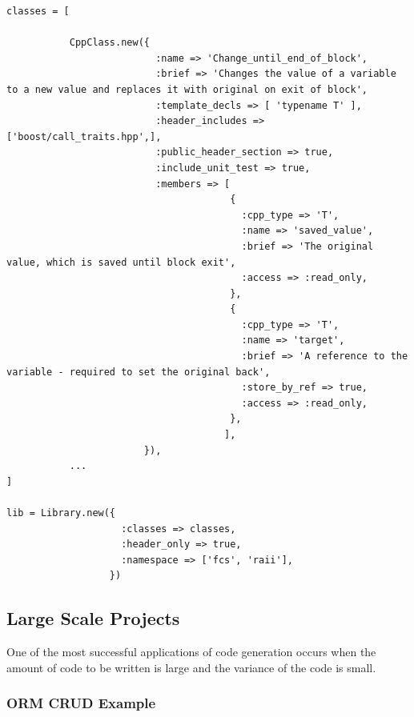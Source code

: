 \documentclass[11pt]{article}
\begin{document}
\lstset{language=Ruby}
\begin{lstlisting}
classes = [

           CppClass.new({ 
                          :name => 'Change_until_end_of_block',
                          :brief => 'Changes the value of a variable to a new value and replaces it with original on exit of block',
                          :template_decls => [ 'typename T' ],
                          :header_includes => ['boost/call_traits.hpp',],
                          :public_header_section => true,
                          :include_unit_test => true,
                          :members => [
                                       { 
                                         :cpp_type => 'T',
                                         :name => 'saved_value',
                                         :brief => 'The original value, which is saved until block exit',
                                         :access => :read_only,
                                       },
                                       { 
                                         :cpp_type => 'T',
                                         :name => 'target',
                                         :brief => 'A reference to the variable - required to set the original back',
                                         :store_by_ref => true,
                                         :access => :read_only,
                                       },
                                      ],
                        }),
           ...
]

lib = Library.new({ 
                    :classes => classes,
                    :header_only => true,
                    :namespace => ['fcs', 'raii'],
                  })
\end{lstlisting}



\subsection{Large Scale Projects}
\label{sec-4.2}


   One of the most successful applications of code generation occurs
   when the amount of code to be written is large and the variance of
   the code is small. 


\subsubsection{ORM CRUD Example}
\label{sec-4.2.1}
\end{document}
